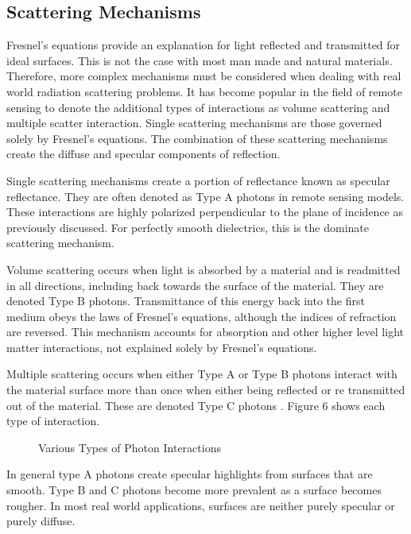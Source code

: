 \subsection{Scattering Mechanisms}

Fresnel’s equations provide an explanation for light reflected and transmitted for ideal surfaces.  This is not the case with most man made and natural materials.  Therefore, more complex mechanisms must be considered when dealing with real world radiation scattering problems.  It has become popular in the field of remote sensing to denote the additional types of interactions as volume scattering and multiple scatter interaction.  Single scattering mechanisms are those governed solely by Fresnel’s equations.  The combination of these scattering mechanisms create the diffuse and specular components of reflection.

Single scattering mechanisms create a portion of reflectance known as specular reflectance.  They are often denoted as Type A photons in remote sensing models.  These interactions are highly polarized perpendicular to the plane of incidence as previously discussed. For perfectly smooth dielectrics, this is the dominate scattering mechanism.

Volume scattering occurs when light is absorbed by a material and is readmitted in all directions, including back towards the surface of the material.  They are denoted Type B photons.  Transmittance of this energy back into the first medium obeys the laws of Fresnel’s equations, although the indices of refraction are reversed.  This mechanism accounts for absorption and other higher level light matter interactions, not explained solely by Fresnel’s equations.

Multiple scattering occurs when either Type A or Type B photons interact with the material surface more than once when either being reflected or re transmitted out of the material.  These are denoted Type C photons \cite{schott}.  Figure 6 shows each type of interaction.
%
\begin{figure}[!htb]
    \begin{center}
    \end{center}
    \caption{Various Types of Photon Interactions}
    \label{fig:scattering}
\end{figure}
%
In general type A photons create specular highlights from surfaces that are smooth.  Type B and C photons become more prevalent as a surface becomes rougher.  In most real world applications, surfaces are neither purely specular or purely diffuse.

